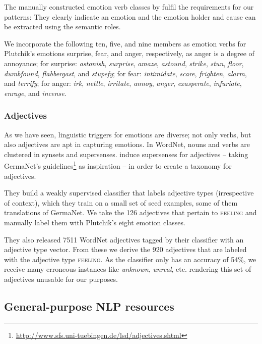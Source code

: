 The manually constructed emotion verb classes by \citeauthor{emotion_verbs} fulfil the requirements for our patterns: They clearly indicate an emotion and the emotion holder and cause can be extracted using the semantic roles.

We incorporate the following ten, five, and nine members as emotion verbs for Plutchik's emotions surprise, fear, and anger, respectively, as anger is a degree of annoyance; for surprise: \textit{astonish}, \textit{surprise}, \textit{amaze}, \textit{astound}, \textit{strike}, \textit{stun}, \textit{floor}, \textit{dumbfound}, \textit{flabbergast}, and \textit{stupefy}; for fear: \textit{intimidate}, \textit{scare}, \textit{frighten}, \textit{alarm}, and \textit{terrify}; for anger: \textit{irk}, \textit{nettle}, \textit{irritate}, \textit{annoy}, \textit{anger}, \textit{exasperate}, \textit{infuriate}, \textit{enrage}, and \textit{incense}.

\subsubsection{Adjectives}

As we have seen, linguistic triggers for emotions are diverse; not only verbs, but also adjectives are apt in capturing emotions. In WordNet, nouns and verbs are clustered in synsets and supersenses. \citeauthor{adjective_supersenses} induce supersenses for adjectives -- taking GermaNet's guidelines\footnote{\url{http://www.sfs.uni-tuebingen.de/lsd/adjectives.shtml}} as inspiration -- in order to create a taxonomy for adjectives.

They build a weakly supervised classifier that labels adjective types (irrespective of context), which they train on a small set of seed examples, some of them translations of GermaNet. We take the 126 adjectives that pertain to \textsc{feeling} and manually label them with Plutchik's eight emotion classes.

They also released 7511 WordNet adjectives tagged by their classifier with an adjective type vector. From these we derive the 920 adjectives that are labeled with the adjective type \textsc{feeling}. As the classifier only has an accuracy of 54\%, we receive many erroneous instances like \textit{unknown}, \textit{unreal}, etc. rendering this set of adjectives unusable for our purposes.

\subsection{General-purpose NLP resources}

